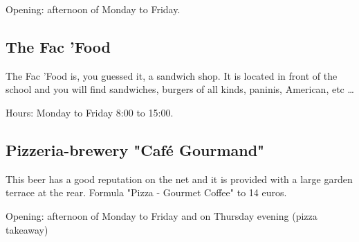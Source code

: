 Opening: afternoon of Monday to Friday.




\subsection{The Fac 'Food}

The Fac 'Food is, you guessed it, a sandwich shop. It is located in front of the school and you will find sandwiches, burgers of all kinds, paninis, American, etc \dots

Hours: Monday to Friday 8:00 to 15:00.




\subsection{Pizzeria-brewery "Café Gourmand"}

This beer has a good reputation on the net and it is provided with a large garden terrace at the rear.
Formula "Pizza - Gourmet Coffee" to 14 euros.

Opening: afternoon of Monday to Friday and on Thursday evening (pizza takeaway)



